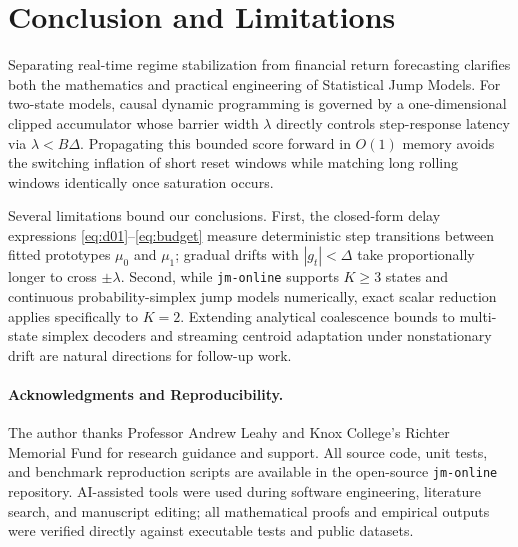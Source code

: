 \documentclass[11pt]{article}
\begin{document}
\section{Conclusion and Limitations}

Separating real-time regime stabilization from financial return forecasting clarifies both the mathematics and practical engineering of Statistical Jump Models. For two-state models, causal dynamic programming is governed by a one-dimensional clipped accumulator whose barrier width $\lambda$ directly controls step-response latency via $\lambda < B\Delta$. Propagating this bounded score forward in $O(1)$ memory avoids the switching inflation of short reset windows while matching long rolling windows identically once saturation occurs.

Several limitations bound our conclusions. First, the closed-form delay expressions \eqref{eq:d01}--\eqref{eq:budget} measure deterministic step transitions between fitted prototypes $\mu_0$ and $\mu_1$; gradual drifts with $|g_t| < \Delta$ take proportionally longer to cross $\pm\lambda$. Second, while \texttt{jm-online} supports $K \ge 3$ states and continuous probability-simplex jump models numerically, exact scalar reduction applies specifically to $K = 2$. Extending analytical coalescence bounds to multi-state simplex decoders and streaming centroid adaptation under nonstationary drift are natural directions for follow-up work.

\paragraph{Acknowledgments and Reproducibility.}
The author thanks Professor Andrew Leahy and Knox College's Richter Memorial Fund for research guidance and support. All source code, unit tests, and benchmark reproduction scripts are available in the open-source \texttt{jm-online} repository. AI-assisted tools were used during software engineering, literature search, and manuscript editing; all mathematical proofs and empirical outputs were verified directly against executable tests and public datasets.
\end{document}

